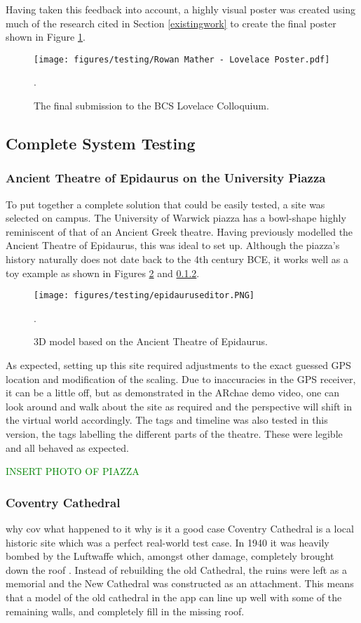 \documentclass{article}
\newcommand{\could}[1]{\textcolor{green}{#1}}
\begin{document}
Having taken this feedback into account, a highly visual poster was created using much of the research cited in Section \ref{existingwork} to create the final poster shown in Figure \ref{fig:bcsposter}. 

\begin{figure}
\centering
    \texttt{[image: figures/testing/Rowan Mather - Lovelace Poster.pdf]}
        \caption{The final submission to the BCS Lovelace Colloquium.}.
        \label{fig:bcsposter}
\end{figure}

\subsection{Complete System Testing}

\subsubsection{Ancient Theatre of Epidaurus on the University Piazza}
To put together a complete solution that could be easily tested, a site was selected on campus. The University of Warwick piazza has a bowl-shape highly reminiscent of that of an Ancient Greek theatre. Having previously modelled the Ancient Theatre of Epidaurus, this was ideal to set up. Although the piazza's history naturally does not date back to the 4th century BCE, it works well as a toy example as shown in Figures \ref{fig:epidaurus} and \ref{}.

\begin{figure}
\centering
    \texttt{[image: figures/testing/epidauruseditor.PNG]}
        \caption{3D model based on the Ancient Theatre of Epidaurus.}.
        \label{fig:epidaurus}
\end{figure}

As expected, setting up this site required adjustments to the exact guessed GPS location and modification of the scaling. Due to inaccuracies in the GPS receiver, it can be a little off, but as demonstrated in the ARchae demo video, one can look around and walk about the site as required and the perspective will shift in the virtual world accordingly. The tags and timeline was also tested in this version, the tags labelling the different parts of the theatre. These were legible and all behaved as expected.

\could{INSERT PHOTO OF PIAZZA}

\subsubsection{Coventry Cathedral}
why cov what happened to it why is it a good case
Coventry Cathedral is a local historic site which was a perfect real-world test case. In 1940 it was heavily bombed by the Luftwaffe which, amongst other damage, completely brought down the roof \cite{testing:covhistory}. Instead of rebuilding the old Cathedral, the ruins were left as a memorial and the New Cathedral was constructed as an attachment. This means that a model of the old cathedral in the app can line up well with some of the remaining walls, and completely fill in the missing roof. 
\end{document}
